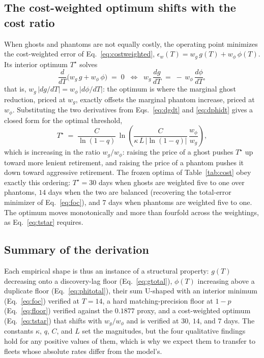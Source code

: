 \documentclass[journal]{IEEEtran}
\begin{document}
\subsection{The cost-weighted optimum shifts with the cost ratio}
When ghosts and phantoms are not equally costly, the operating point minimizes the cost-weighted
error of Eq.~\eqref{eq:costweighted}, $\epsilon_w(T) = w_g\,g(T) + w_\phi\,\phi(T)$. Its interior
optimum $T^\star$ solves
\begin{equation}
\frac{d}{dT}\bigl(w_g\,g + w_\phi\,\phi\bigr) \;=\; 0
\;\;\Longleftrightarrow\;\;
w_g \,\frac{dg}{dT} \;=\; -\,w_\phi \,\frac{d\phi}{dT},
\label{eq:costfoc}
\end{equation}
that is, $w_g\,|dg/dT| = w_\phi\,|d\phi/dT|$: the optimum is where the marginal ghost reduction,
priced at $w_g$, exactly offsets the marginal phantom increase, priced at $w_\phi$. Substituting the
two derivatives from Eqs.~\eqref{eq:dgdt} and \eqref{eq:dphidt} gives a closed form for the optimal
threshold,
\begin{equation}
T^\star \;=\; \frac{C}{\ln(1-q)}\,
\ln\!\left(\frac{C}{\kappa\,L\,|\ln(1-q)|}\,\frac{w_\phi}{w_g}\right),
\label{eq:tstar}
\end{equation}
which is increasing in the ratio $w_g / w_\phi$: raising the price of a ghost pushes $T^\star$ up
toward more lenient retirement, and raising the price of a phantom pushes it down toward aggressive
retirement. The frozen optima of Table~\ref{tab:cost} obey exactly this ordering: $T^\star = 30$ days
when ghosts are weighted five to one over phantoms, $14$ days when the two are balanced (recovering
the total-error minimizer of Eq.~\eqref{eq:foc}), and $7$ days when phantoms are weighted five to
one. The optimum moves monotonically and more than fourfold across the weightings, as
Eq.~\eqref{eq:tstar} requires.

\subsection{Summary of the derivation}
Each empirical shape is thus an instance of a structural property: $g(T)$ decreasing onto a discovery-lag
floor (Eq.~\eqref{eq:gtotal}), $\phi(T)$ increasing above a duplicate floor (Eq.~\eqref{eq:phitotal}),
their sum U-shaped with an interior minimum (Eq.~\eqref{eq:foc}) verified at $T = 14$, a hard
matching-precision floor at $1 - p$ (Eq.~\eqref{eq:floor}) verified against the $0.1877$ proxy, and a
cost-weighted optimum (Eq.~\eqref{eq:tstar}) that shifts with $w_g / w_\phi$ and is verified at $30$,
$14$, and $7$ days. The constants $\kappa$, $q$, $C$, and $L$ set the magnitudes, but the four
qualitative findings hold for any positive values of them, which is why we expect them to transfer to
fleets whose absolute rates differ from the model's.
\end{document}
